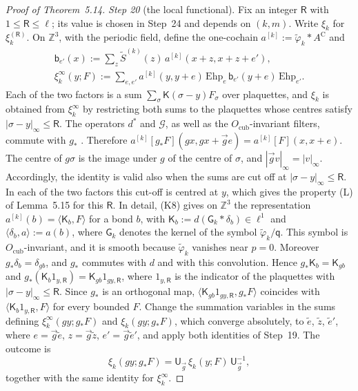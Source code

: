 \documentclass[11pt]{amsart}
\theoremstyle{definition}
\begin{document}
\begin{proof}[Proof of Theorem~5.14]
\emph{Step 20} (the local functional).
Fix an integer $\mathsf R$ with $1\le\mathsf R\le\ell$; its value is chosen in Step~24 and depends on $(k,m)$.
Write $\xi_k$ for $\xi_k^{(\mathsf R)}$.
On $\mathbb Z^3$, with the periodic field, define the one-cochain $a^{[k]}:=\tilde\varphi_k*A^{\mathrm C}$ and
\begin{gather*}
\mathsf b_{e'}(x):=\sum_z\tilde S^{(k)}(z)\,a^{[k]}(x+z,x+z+e'),\\
\xi_k^\infty(y;F):=\sum_{e,e'}a^{[k]}(y,y+e)\,\mathrm{Ehp}_e\,\mathsf b_{e'}(y+e)\,\mathrm{Ehp}_{e'}.
\end{gather*}
Each of the two factors is a sum $\sum_\sigma\mathsf K(\sigma-y)F_\sigma$ over plaquettes, and $\xi_k$ is obtained from $\xi_k^\infty$ by restricting both sums to the plaquettes whose centres satisfy $|\sigma-y|_\infty\le\mathsf R$.
The operators $d^*$ and $\mathcal G$, as well as the $O_{\mathrm{cub}}$-invariant filters, commute with $g_*$ \cite[Definition~2.1]{QEDII}.
Therefore $a^{[k]}[g_*F](gx,gx+\vec ge)=a^{[k]}[F](x,x+e)$.
The centre of $g\sigma$ is the image under $g$ of the centre of $\sigma$, and $|\vec gv|_\infty=|v|_\infty$.
Accordingly, the identity is valid also when the sums are cut off at $|\sigma-y|_\infty\le\mathsf R$.
In each of the two factors this cut-off is centred at $y$, which gives the property (L) of Lemma~5.15 for this $\mathsf R$.
In detail, (K8) gives on $\mathbb Z^3$ the representation $a^{[k]}(b)=\langle\mathsf K_b,F\rangle$ for a bond $b$, with $\mathsf K_b:=d(\mathsf G_k*\delta_b)\in\ell^1$ and $\langle\delta_b,a\rangle:=a(b)$, where $\mathsf G_k$ denotes the kernel of the symbol $\tilde\varphi_k/\mathsf q$.
This symbol is $O_{\mathrm{cub}}$-invariant, and it is smooth because $\tilde\varphi_k$ vanishes near $p=0$.
Moreover $g_*\delta_b=\delta_{gb}$, and $g_*$ commutes with $d$ and with this convolution.
Hence $g_*\mathsf K_b=\mathsf K_{gb}$ and $g_*(\mathsf K_b1_{y,\mathsf R})=\mathsf K_{gb}1_{gy,\mathsf R}$, where $1_{y,\mathsf R}$ is the indicator of the plaquettes with $|\sigma-y|_\infty\le\mathsf R$.
Since $g_*$ is an orthogonal map, $\langle\mathsf K_{gb}1_{gy,\mathsf R},g_*F\rangle$ coincides with $\langle\mathsf K_b1_{y,\mathsf R},F\rangle$ for every bounded $F$.
Change the summation variables in the sums defining $\xi_k^\infty(gy;g_*F)$ and $\xi_k(gy;g_*F)$, which converge absolutely, to $\tilde e$, $\tilde z$, $\tilde e'$, where $e=\vec g\tilde e$, $z=\vec g\tilde z$, $e'=\vec g\tilde e'$, and apply both identities of Step~19.
The outcome is
\begin{equation*}
\xi_k(gy;g_*F)=\mathsf U_{\vec g}\,\xi_k(y;F)\,\mathsf U_{\vec g}^{-1},
\end{equation*}
together with the same identity for $\xi_k^\infty$.


\end{proof}
\end{document}
